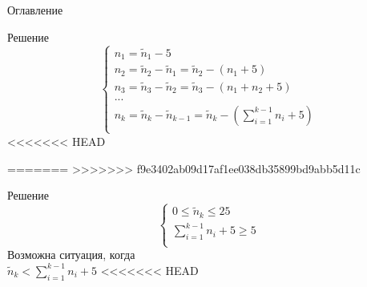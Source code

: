 \documentclass[12pt]{beamer}
\begin{document}
\begin{frame}{Оглавление}
\begin{frame}{Решение}
\fontsize{15pt}{15pt}\selectfont
    \begin{equation}
        \begin{cases}
            n_{1} = \widetilde{n}_{1} - 5\\
            n_{2} = \widetilde{n}_{2} - \widetilde{n}_{1} = \widetilde{n}_{2} - (n_{1} + 5)\\
            n_{3} = \widetilde{n}_{3} - \widetilde{n}_{2} = \widetilde{n}_{3} - (n_{1} + n_{2} + 5)\\
            ...\\
            n_{k} = \widetilde{n}_{k} - \widetilde{n}_{k-1} = \widetilde{n}_{k} - (\sum\limits_{i=1}^{k-1} n_{i} + 5)\\
        \end{cases}
    \end{equation}
<<<<<<< HEAD
    
    
=======
>>>>>>> f9e3402ab09d17af1ee038db35899bd9abb5d11c
\end{frame}

\begin{frame}{Решение}
\centering
\fontsize{15pt}{15pt}\selectfont
    \begin{equation}
        \begin{cases}
            0 \leq \widetilde{n}_{k} \leq 25\\
            \sum\limits_{i=1}^{k-1} n_{i} + 5 \geq 5\\
        \end{cases}
    \end{equation}
    Возможна ситуация, когда\\
    $\widetilde{n}_{k} < \sum\limits_{i=1}^{k-1} n_{i} + 5$
<<<<<<< HEAD
    
    

\end{frame}
\end{frame}
\end{document}
